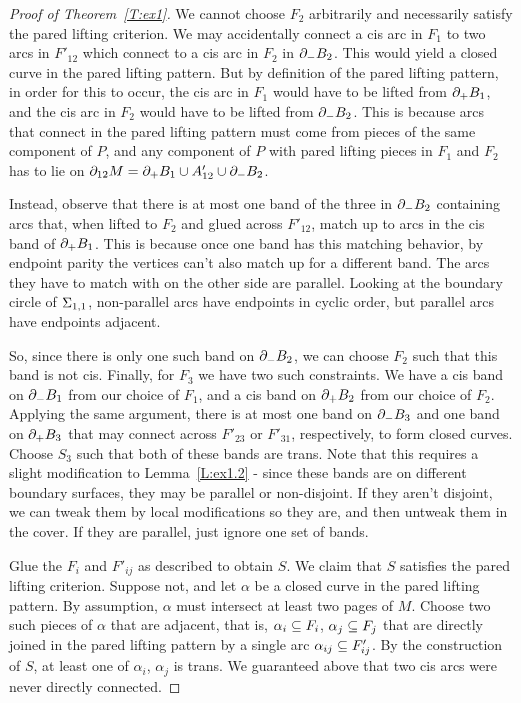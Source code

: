 \begin{proof}[Proof of Theorem~\ref{T:ex1}]
We cannot choose $F_2$ arbitrarily and necessarily satisfy the pared lifting
criterion. We may accidentally connect a cis arc in $F_1$ to two arcs in
$F'_{12}$ which connect to a cis arc in $F_2$ in $\partial_-B_2$. This would yield
a closed curve in the pared lifting pattern. But by definition of the pared
lifting pattern, in order for this to occur, the cis arc in $F_1$ would have to
be lifted from $\partial_+ B_1$, and the cis arc in $F_2$ would have to be lifted
from $\partial_- B_2$. This is because arcs that connect in the pared lifting
pattern must come from pieces of the same component of $P$, and any component
of $P$ with pared lifting pieces in $F_1$ and $F_2$ has to lie on $\partial_{12}
M = \partial_+ B_1 \cup A'_{12} \cup \partial_- B_2$.

Instead, observe that there is at most one band of the three in $\partial_-B_2$
containing arcs that, when lifted to $F_2$ and glued across $F'_{12}$, match up
to arcs in the cis band of $\partial_+B_1$. This is because once one band has this
matching behavior, by endpoint parity the vertices can't also match up for
a different band. The arcs they have to match with on the other side are
parallel. Looking at the boundary circle of $\Sigma_{1,1}$, non-parallel arcs have
endpoints in cyclic order, but parallel arcs have endpoints adjacent.

So, since there is only one such band on $\partial_-B_2$, we can choose $F_2$ such
that this band is not cis.  Finally, for $F_3$ we have two such constraints.
We have a cis band on $\partial_-B_1$ from our choice of $F_1$, and a cis band on
$\partial_+B_2$ from our choice of $F_2$.  Applying the same argument, there is at
most one band on $\partial_-B_3$ and one band on $\partial_+B_3$ that may connect across
$F'_{23}$ or $F'_{31}$, respectively, to form closed curves. Choose $S_3$ such
that both of these bands are trans. Note that this requires a slight
modification to Lemma~\ref{L:ex1.2} - since these bands are on different
boundary surfaces, they may be parallel or non-disjoint.  If they aren't
disjoint, we can tweak them by local modifications so they are, and then
untweak them in the cover. If they are parallel, just ignore one set of bands.

Glue the $F_i$ and $F'_{ij}$ as described to obtain $S$. We claim that $S$
satisfies the pared lifting criterion. Suppose not, and let $\alpha$ be
a closed curve in the pared lifting pattern.  By assumption, $\alpha$ must
intersect at least two pages of $M$. Choose two such pieces of $\alpha$ that
are adjacent, that is, $\alpha_i\subseteq F_i$, $\alpha_j \subseteq F_j$ that are
directly joined in the pared lifting pattern by a single arc $\alpha_{ij} \subseteq
F'_{ij}$.  By the construction of $S$, at least one of $\alpha_i$, $\alpha_j$
is trans. We guaranteed above that two cis arcs were never directly connected.


\end{proof}
